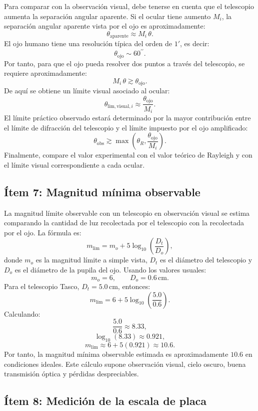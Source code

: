 Para comparar con la observación visual, debe tenerse en cuenta que el telescopio aumenta la separación angular aparente. Si el ocular tiene aumento $M_i$, la separación angular aparente vista por el ojo es aproximadamente:
$$
\theta_{\mathrm{aparente}} \approx M_i\,\theta.
$$
El ojo humano tiene una resolución típica del orden de $1'$, es decir:
$$
\theta_{\mathrm{ojo}}\sim 60^{\prime\prime}.
$$
Por tanto, para que el ojo pueda resolver dos puntos a través del telescopio, se requiere aproximadamente:
$$
M_i\,\theta \gtrsim \theta_{\mathrm{ojo}}.
$$
De aquí se obtiene un límite visual asociado al ocular:
$$
\theta_{\mathrm{lim,visual},i}\approx \frac{\theta_{\mathrm{ojo}}}{M_i}.
$$
El límite práctico observado estará determinado por la mayor contribución entre el límite de difracción del telescopio y el límite impuesto por el ojo amplificado:
$$
\theta_{\mathrm{obs}} \gtrsim \max\left(\theta_R,\frac{\theta_{\mathrm{ojo}}}{M_i}\right).
$$
Finalmente, compare el valor experimental con el valor teórico de Rayleigh y con el límite visual correspondiente a cada ocular.



\subsection{Ítem 7: Magnitud mínima observable}

La magnitud límite observable con un telescopio en observación visual se estima comparando la cantidad de luz recolectada por el telescopio con la recolectada por el ojo. La fórmula es:
$$
m_{\lim}=m_o+5\log_{10}\left(\frac{D_t}{D_o}\right),
$$
donde $m_o$ es la magnitud límite a simple vista, $D_t$ es el diámetro del telescopio y $D_o$ es el diámetro de la pupila del ojo. Usando los valores usuales:
$$
m_o=6,
\qquad
D_o=0.6\,\mathrm{cm}.
$$
Para el telescopio Tasco, $D_t=5.0\,\mathrm{cm}$, entonces:
$$
m_{\lim}=6+5\log_{10}\left(\frac{5.0}{0.6}\right).
$$
Calculando:
$$
\frac{5.0}{0.6}\approx 8.33,
$$
$$
\log_{10}(8.33)\approx 0.921,
$$
$$
m_{\lim}\approx 6+5(0.921)\approx 10.6.
$$
Por tanto, la magnitud mínima observable estimada es aproximadamente $10.6$ en condiciones ideales. Este cálculo supone observación visual, cielo oscuro, buena transmisión óptica y pérdidas despreciables.

\subsection{Ítem 8: Medición de la escala de placa}

